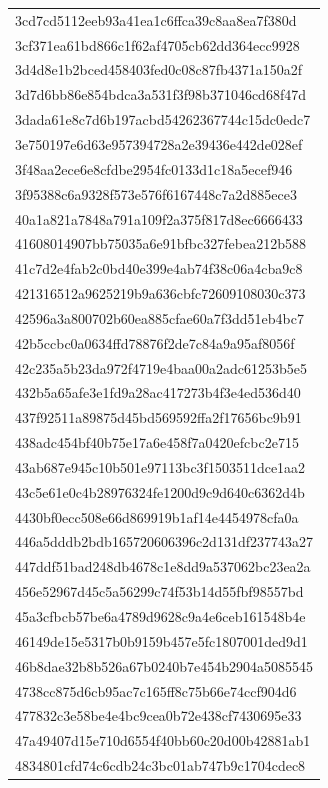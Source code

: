 \begin{tabular}{l}
3cd7cd5112eeb93a41ea1c6ffca39c8aa8ea7f380d \\
3cf371ea61bd866c1f62af4705cb62dd364ecc9928 \\
3d4d8e1b2bced458403fed0c08c87fb4371a150a2f \\
3d7d6bb86e854bdca3a531f3f98b371046cd68f47d \\
3dada61e8c7d6b197acbd54262367744c15dc0edc7 \\
3e750197e6d63e957394728a2e39436e442de028ef \\
3f48aa2ece6e8cfdbe2954fc0133d1c18a5ecef946 \\
3f95388c6a9328f573e576f6167448c7a2d885ece3 \\
40a1a821a7848a791a109f2a375f817d8ec6666433 \\
41608014907bb75035a6e91bfbc327febea212b588 \\
41c7d2e4fab2c0bd40e399e4ab74f38c06a4cba9c8 \\
421316512a9625219b9a636cbfc72609108030c373 \\
42596a3a800702b60ea885cfae60a7f3dd51eb4bc7 \\
42b5ccbc0a0634ffd78876f2de7c84a9a95af8056f \\
42c235a5b23da972f4719e4baa00a2adc61253b5e5 \\
432b5a65afe3e1fd9a28ac417273b4f3e4ed536d40 \\
437f92511a89875d45bd569592ffa2f17656bc9b91 \\
438adc454bf40b75e17a6e458f7a0420efcbc2e715 \\
43ab687e945c10b501e97113bc3f1503511dce1aa2 \\
43c5e61e0c4b28976324fe1200d9c9d640c6362d4b \\
4430bf0ecc508e66d869919b1af14e4454978cfa0a \\
446a5dddb2bdb165720606396c2d131df237743a27 \\
447ddf51bad248db4678c1e8dd9a537062bc23ea2a \\
456e52967d45c5a56299c74f53b14d55fbf98557bd \\
45a3cfbcb57be6a4789d9628c9a4e6ceb161548b4e \\
46149de15e5317b0b9159b457e5fc1807001ded9d1 \\
46b8dae32b8b526a67b0240b7e454b2904a5085545 \\
4738cc875d6cb95ac7c165ff8c75b66e74ccf904d6 \\
477832c3e58be4e4bc9cea0b72e438cf7430695e33 \\
47a49407d15e710d6554f40bb60c20d00b42881ab1 \\
4834801cfd74c6cdb24c3bc01ab747b9c1704cdec8 \\

\end{tabular}
